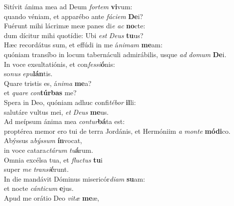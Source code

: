 \evenverse Sitívit ánima mea ad Deum \textit{for}\textit{tem} \textbf{vi}vum:~\*\\
\evenverse quando véniam, et apparébo ante \textit{fá}\textit{ci}\textit{em} \textbf{De}i?\\
\oddverse Fuérunt mihi lácrimæ meæ panes di\textit{e} \textit{ac} \textbf{no}cte:~\*\\
\oddverse dum dícitur mihi quotídie: Ubi \textit{est} \textit{De}\textit{us} \textbf{tu}us?\\
\evenverse Hæc recordátus sum, et effúdi in me á\textit{ni}\textit{mam} \textbf{me}am:~\*\\
\evenverse quóniam transíbo in locum tabernáculi admirábilis, usque \textit{ad} \textit{do}\textit{mum} \textbf{De}i.\\
\oddverse In voce exsultatiónis, et con\textit{fes}\textit{si}\textbf{ó}nis:~\*\\
\oddverse so\textit{nus} \textit{e}\textit{pu}\textbf{lán}tis.\\
\evenverse Quare tristis es, á\textit{ni}\textit{ma} \textbf{me}a?~\*\\
\evenverse et \textit{qua}\textit{re} \textit{con}\textbf{túr}\textbf{bas} me?\\
\oddverse Spera in Deo, quóniam adhuc confi\textit{té}\textit{bor} \textbf{il}li:~\*\\
\oddverse salutáre vultus mei, \textit{et} \textit{De}\textit{us} \textbf{me}us.\\
\evenverse Ad meípsum ánima mea \textit{con}\textit{tur}\textbf{bá}ta est:~\*\\
\evenverse proptérea memor ero tui de terra Jordánis, et Hermóniim \textit{a} \textit{mon}\textit{te} \textbf{mó}\textbf{di}co.\\
\oddverse Abýssus a\textit{býs}\textit{sum} \textbf{ín}vocat,~\*\\
\oddverse in voce catara\textit{ctá}\textit{rum} \textit{tu}\textbf{á}rum.\\
\evenverse Omnia excélsa tua, et \textit{flu}\textit{ctus} \textbf{tu}i~\*\\
\evenverse super \textit{me} \textit{tran}\textit{si}\textbf{é}runt.\\
\oddverse In die mandávit Dóminus misericór\textit{di}\textit{am} \textbf{su}am:~\*\\
\oddverse et nocte \textit{cán}\textit{ti}\textit{cum} \textbf{e}jus.\\
\evenverse Apud me orátio Deo \textit{vi}\textit{tæ} \textbf{me}æ,~\*\\

